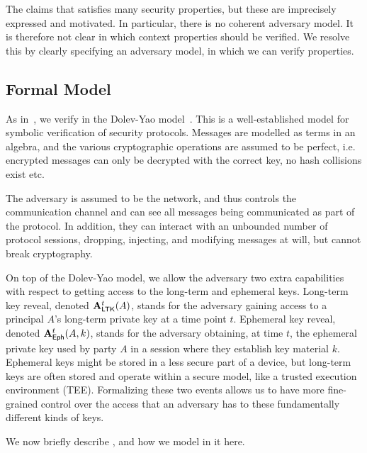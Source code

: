 The \mEdhoc{} \mSpec{} \cite{our-analysis-selander-lake-edhoc-00} claims
that \mEdhoc{} satisfies many security properties, but these are imprecisely
expressed and motivated.
%
In particular, there is no coherent adversary model.
%
It is therefore not clear in which context properties should be verified.
%
We resolve this by clearly specifying an adversary model, in which we can verify
properties.
%

\subsection{Formal Model}\label{sec:threat-model}

As in~\cite{Norr21}, we verify \mEdhoc{} in the Dolev-Yao model~\cite{DY83}.
%
This is a well-established model for symbolic verification of security protocols.
%
Messages are modelled as terms in an algebra, and the various cryptographic operations are assumed to be perfect, i.e. encrypted messages can only be decrypted with the correct key, no hash collisions exist etc.
%

The adversary is assumed to be the network, and thus controls the communication channel and can see all messages being communicated as part of the protocol.
%
In addition, they can interact with an unbounded number of protocol sessions, dropping, injecting, and modifying messages at will, but cannot break cryptography.

On top of the Dolev-Yao model, we allow the adversary two extra capabilities with respect to getting access to the long-term and ephemeral keys. 
%
Long-term key reveal, denoted $\mathbf{A}_{\textsf{LTK}}^{t}(A)$, stands for the adversary gaining access to a principal $A$'s long-term private key  at a time point $t$.
%
Ephemeral key reveal, denoted $\mathbf{A}_{\textsf{Eph}}^{t}(A, k)$, stands for the adversary obtaining, at time $t$, the ephemeral private key  used by party $A$  in a session where they establish key material $k$.
%
Ephemeral keys might be stored in a less secure part of a device, but long-term keys are often stored and operate within a secure model, like a trusted execution environment (TEE). 
%
Formalizing these two events allows us to have more fine-grained control over the access that an adversary has to these fundamentally different kinds of keys.
%

We now briefly describe \mTamarin{}, and how we model \mEdhoc{} in it here.


